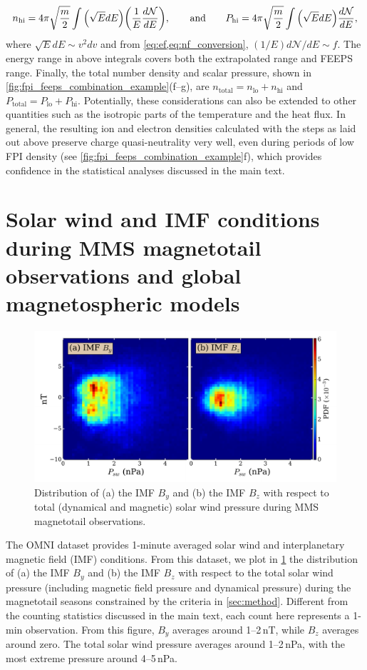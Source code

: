 \documentclass[draft]{agujournal2019}
\begin{document}
\begin{equation}
n_\text{hi}=4\pi\sqrt{\frac{m}{2}}\int\qty(\sqrt{E}dE)\qty(\frac1{E}\frac{d\mathcal{N}}{dE}),\qquad\text{and}\qquad
P_\text{hi}=4\pi\sqrt{\frac{m}{2}}\int\qty(\sqrt{E}dE)\frac{d\mathcal{N}}{dE},
\end{equation}
where $\sqrt{E}dE\sim v^2dv$ and from \cref{eq:ef,eq:nf_conversion}, $(1/E)d\mathcal{N}/dE\sim f$. The energy range in above integrals covers both the extrapolated range and FEEPS range. Finally, the total number density and scalar pressure, shown in \cref{fig:fpi_feeps_combination_example}(f--g), are $n_\text{total}=n_\text{lo}+n_\text{hi}$ and 
$P_\text{total}=P_\text{lo}+P_\text{hi}$. Potentially, these considerations can also be extended to other quantities such as the isotropic parts of the temperature and the heat flux. In general, the resulting ion and electron densities calculated with the steps as laid out above preserve charge quasi-neutrality very well, even during periods of low FPI density (see \mbox{\cref{fig:fpi_feeps_combination_example}f}), which provides confidence in the statistical analyses discussed in the main text.

\section{Solar wind and IMF conditions during MMS magnetotail observations and global magnetospheric models}\label{appendix:omni}

\begin{figure}
\centering
\noindent\includegraphics[width=\textwidth]{2023JA031358R-fb1.pdf}
\caption{
Distribution of (a) the IMF $B_y$ and (b) the IMF $B_z$ with respect to total (dynamical and magnetic) solar wind pressure during MMS magnetotail observations.
}
\label{fig:omni}
\end{figure}

The OMNI dataset \cite{King2005} provides 1-minute averaged solar wind and interplanetary magnetic field (IMF) conditions. From this dataset, we plot in \cref{fig:omni} the distribution of (a) the IMF $B_y$ and (b) the IMF $B_z$ with respect to the total solar wind pressure (including magnetic field pressure and dynamical pressure) during the magnetotail seasons constrained by the criteria in \cref{sec:method}. Different from the counting statistics discussed in the main text, each count here represents a 1-min observation. From this figure, $B_y$ averages around 1--2\,\si{nT}, while $B_z$ averages around zero. The total solar wind pressure averages around 1--2\,\si{nPa}, with the most extreme pressure around 4--5\,\si{nPa}.
\end{document}
